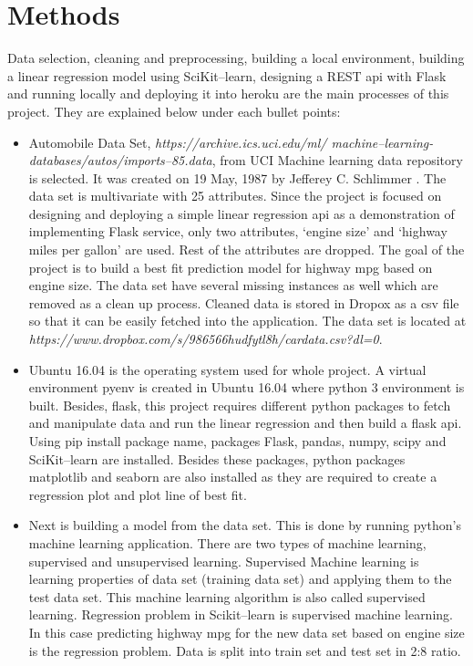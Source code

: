 \section{Methods}
  Data selection, cleaning and preprocessing, building a local
  environment, building a linear regression model using SciKit--learn,
  designing a REST api with Flask and running locally and deploying
  it into heroku are the main
  processes of this project. They are explained below under each bullet
  points:
\begin{itemize}
    \item Automobile Data Set, \textit{https://archive.ics.uci.edu/ml/
          machine--learning-databases/autos/imports--85.data}, from UCI
          Machine learning data repository is selected. It was created
          on 19 May, 1987 by Jefferey C. Schlimmer \cite{uci-com}. The
          data set is multivariate with 25 attributes. Since the project
          is focused on designing and deploying a simple linear
          regression api as a demonstration of implementing Flask service,
          only two attributes, `engine size' and `highway miles per gallon'
          are used. Rest of the attributes are dropped. The goal of the
          project is to build a best fit prediction model for highway mpg
          based on engine size. The data set have several missing instances
 as well which are removed as a clean up process. Cleaned data is stored in
 Dropox as a csv   file so that it can be easily fetched into the
 application. The data set is located at 
 \textit{https://www.dropbox.com/s/986566hudfytl8h/cardata.csv?dl=0}.
    \item Ubuntu 16.04 is the operating system used for whole project.
  A virtual environment pyenv is created in Ubuntu 16.04 where python 3
 environment is built. Besides, flask, this project requires different python
 packages to fetch and manipulate data and run the linear regression and
 then build a flask api. Using pip install package name, packages Flask,
 pandas, numpy, scipy and SciKit--learn are installed. Besides these
 packages, python packages matplotlib and seaborn are also installed as they
 are required to create a regression plot and plot line of best fit. 
    \item Next is building a model from the data set. This is done by
 running python's machine learning application. There are two types of
 machine learning, supervised and unsupervised learning. Supervised
 Machine learning is learning properties of data set (training data set)
 and applying them to the test data set. This machine learning algorithm
 is also called supervised learning. Regression problem in Scikit--learn
 is supervised machine learning. In this case predicting highway mpg for
 the new data set based on engine size is the regression problem. Data
 is split into train set and test set in 2:8 ratio.
    

\end{itemize}
